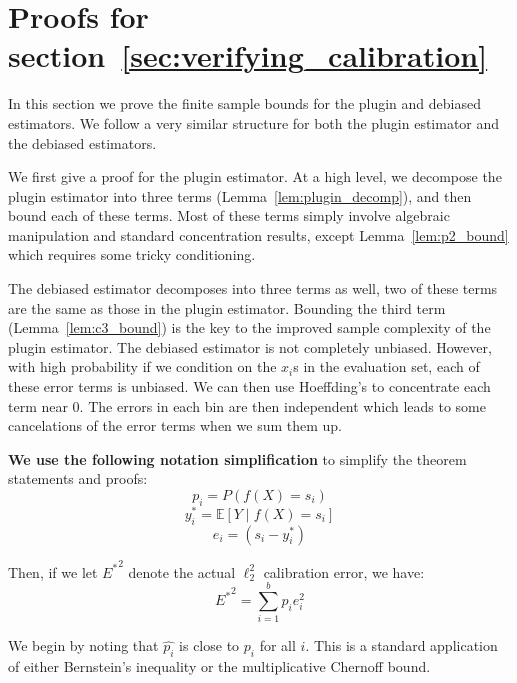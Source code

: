\newpage

\section{Proofs for section~\ref{sec:verifying_calibration}}
\label{sec:verifying_calibration_appendix}

In this section we prove the finite sample bounds for the plugin and debiased estimators. We follow a very similar structure for both the plugin estimator and the debiased estimators.

We first give a proof for the plugin estimator. At a high level, we decompose the plugin estimator into three terms (Lemma~\ref{lem:plugin_decomp}), and then bound each of these terms. Most of these terms simply involve algebraic manipulation and standard concentration results, except Lemma~\ref{lem:p2_bound} which requires some tricky conditioning.

The debiased estimator decomposes into three terms as well, two of these terms are the same as those in the plugin estimator. Bounding the third term (Lemma~\ref{lem:c3_bound}) is the key to the improved sample complexity of the plugin estimator. The debiased estimator is not completely unbiased. However, with high probability if we condition on the $x_i$s in the evaluation set, each of these error terms is unbiased. We can then use Hoeffding's to concentrate each term near 0. The errors in each bin are then independent which leads to some cancelations of the error terms when we sum them up.

\textbf{We use the following notation simplification} to simplify the theorem statements and proofs:
\[ p_i = P(f(X) = s_i) \]
\[ y_i^* = \mathbb{E}[Y \; | \; f(X) = s_i] \]
\[ e_i = (s_i - y_i^*) \]

Then, if we let ${E^*}^2$ denote the actual $\ell_2^2$ calibration error, we have:
\[ {E^*}^2 = \sum_{i=1}^b p_i e_i^2 \]


We begin by noting that $\hat{p_i}$ is close to $p_i$ for all $i$. This is a standard application of either Bernstein's inequality or the multiplicative Chernoff bound.

